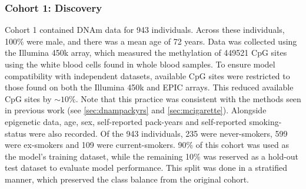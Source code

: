 \documentclass{article} %
\begin{document}
\subsubsection{Cohort 1: Discovery}
Cohort 1 contained DNAm data for 943 individuals. Across these individuals, 100\% were male, and there was a mean age of 72 years. Data was collected using the Illumina 450k array, which measured the methylation of \num{449521} CpG sites using the white blood cells found in whole blood samples. To ensure model compatibility with independent datasets, available CpG sites were restricted to those found on both the Illumina 450k and EPIC arrays. This reduced available CpG sites by \(\sim\!10\%\). Note that this practice was consistent with the methods seen in previous work (see \ref{sec:dnampackyrs} and \ref{sec:mcigarette}). Alongside epigenetic data, age, sex, self-reported pack-years and self-reported smoking-status were also recorded. Of the 943 individuals, 235 were never-smokers, 599 were ex-smokers and 109 were current-smokers. 90\% of this cohort was used as the model's training dataset, while the remaining 10\% was reserved as a hold-out test dataset to evaluate model performance. This split was done in a stratified manner, which preserved the class balance from the original cohort.

\end{document}

